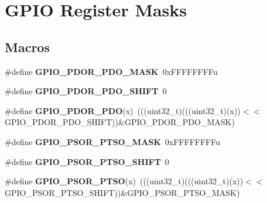 \hypertarget{group___g_p_i_o___register___masks}{}\section{G\+P\+IO Register Masks}
\label{group___g_p_i_o___register___masks}
\subsection*{Macros}
\begin{DoxyCompactItemize}
\item 
\mbox{\label{group___g_p_i_o___register___masks_gafd2a8274691295293b3cabfe86089801}} 
\#define {\bfseries G\+P\+I\+O\+\_\+\+P\+D\+O\+R\+\_\+\+P\+D\+O\+\_\+\+M\+A\+SK}~0x\+F\+F\+F\+F\+F\+F\+F\+Fu
\item 
\mbox{\label{group___g_p_i_o___register___masks_ga495b5f1e63de863534ce0c5f25f137ab}} 
\#define {\bfseries G\+P\+I\+O\+\_\+\+P\+D\+O\+R\+\_\+\+P\+D\+O\+\_\+\+S\+H\+I\+FT}~0
\item 
\mbox{\label{group___g_p_i_o___register___masks_ga4071beeff4d9b5c200686972dd52d855}} 
\#define {\bfseries G\+P\+I\+O\+\_\+\+P\+D\+O\+R\+\_\+\+P\+DO}(x)~(((uint32\+\_\+t)(((uint32\+\_\+t)(x))$<$$<$G\+P\+I\+O\+\_\+\+P\+D\+O\+R\+\_\+\+P\+D\+O\+\_\+\+S\+H\+I\+FT))\&G\+P\+I\+O\+\_\+\+P\+D\+O\+R\+\_\+\+P\+D\+O\+\_\+\+M\+A\+SK)
\item 
\mbox{\label{group___g_p_i_o___register___masks_gaa8a48e38ef70ff1ba3bbcbf31b891da4}} 
\#define {\bfseries G\+P\+I\+O\+\_\+\+P\+S\+O\+R\+\_\+\+P\+T\+S\+O\+\_\+\+M\+A\+SK}~0x\+F\+F\+F\+F\+F\+F\+F\+Fu
\item 
\mbox{\label{group___g_p_i_o___register___masks_ga5a962b85e07477e26afe639c7ca478cb}} 
\#define {\bfseries G\+P\+I\+O\+\_\+\+P\+S\+O\+R\+\_\+\+P\+T\+S\+O\+\_\+\+S\+H\+I\+FT}~0
\item 
\mbox{\label{group___g_p_i_o___register___masks_ga6b16f5841a5c5f20311eafc574f814e4}} 
\#define {\bfseries G\+P\+I\+O\+\_\+\+P\+S\+O\+R\+\_\+\+P\+T\+SO}(x)~(((uint32\+\_\+t)(((uint32\+\_\+t)(x))$<$$<$G\+P\+I\+O\+\_\+\+P\+S\+O\+R\+\_\+\+P\+T\+S\+O\+\_\+\+S\+H\+I\+FT))\&G\+P\+I\+O\+\_\+\+P\+S\+O\+R\+\_\+\+P\+T\+S\+O\+\_\+\+M\+A\+SK)

\end{DoxyCompactItemize}
